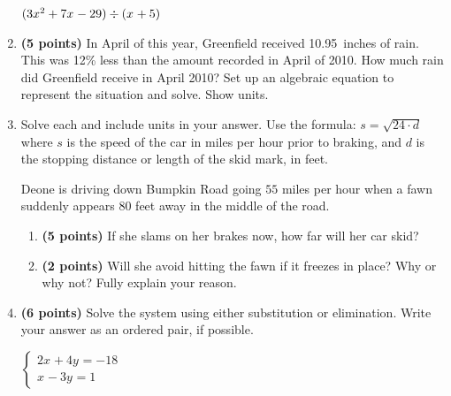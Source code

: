 \documentclass[12pt]{amsart}
\begin{document}
\begin{enumerate}
$(3x^{2}+7x^{}-29) \div (x^{}+5)$

\vfill  \vfill \vfill
\newpage\def \discount{12}\def \paid{1936.66}\def \rainy{10.95}\def \orcost{2200.75}\def \purcost{1729.16}\def \orrainy{12.44}
\item {\bf (5 points)} 
 In April of this year, Greenfield received \rainy\ inches of rain. This was \discount\% less than the amount recorded in April of 2010. How much rain did Greenfield  receive in April 2010? Set up an algebraic equation to represent the situation and solve. Show units.

\vfill 
\def \insvar{24}\def \d{80}\def \zerospeed{43.82}\def \slimit{55}\def \s{60}\def \skidd{150.0}\def \safed{126.042}\def \rsafed{126}

 
\item Solve each and include units in your answer. Use the formula: $s = \sqrt{\insvar \cdot d}$ where $s$ is the speed of the car in miles per hour prior to braking, and $d$ is the stopping distance or length of the skid mark, in feet. 

\vspace{3mm}

Deone is driving down Bumpkin Road going $\slimit$ miles per hour when a fawn suddenly appears $\d$ feet away in the middle of the road. \begin{enumerate}
\item {\bf (5 points)} If she slams on her brakes now, how far will her car skid? \vspace{4cm}
\item {\bf (2 points)} Will she avoid hitting the fawn if it freezes in place? Why or why not? Fully explain your reason. \vspace{3cm}
\end{enumerate}


\newpage\def \xis{-5}\def \yis{-2}\def \nomatcho{[5,2,2,3]}\def \a{-5}\def \c{-2}\def \b{-2}\def \d{-3}\def \polyonesol{29}\def \polytwosol{16}\def \xgoodone{-5x^{}}\def \ygoodone{-2y^{}}\def \xgoodtwo{-2x^{}}\def \ygoodtwo{-3y^{}}\def \unitize{[0,0,1,0,0,1]}\def \mtem{2}\def \ntem{4}\def \ptem{-5}\def \qtem{-3}\def \m{2}\def \n{4}\def \p{1}\def \q{-3}\def \polytonesol{-18}\def \polyttwosol{1}\def \xtgoodone{2x^{}}\def \ytgoodone{+4y^{}}\def \xtgoodtwo{x^{}}\def \ytgoodtwo{-3y^{}}
\item {\bf (6 points)} 
 Solve the system using either substitution or elimination. Write your answer as an ordered pair, if possible. 

$ \begin{cases} \xtgoodone \ytgoodone = \polytonesol \\
\xtgoodtwo \ytgoodtwo = \polyttwosol
\end{cases}$


\end{enumerate}
\end{document}
